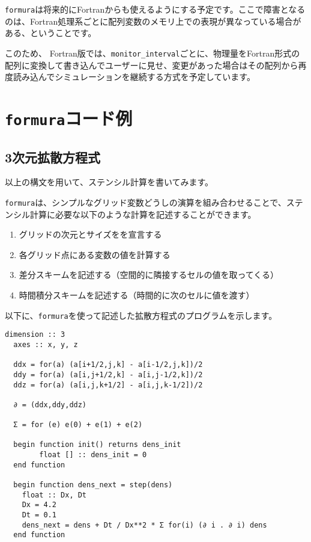\documentclass{jsarticle}
\newcommand{\formura}{{\texttt{formura}}}
\begin{document}
\formura は将来的にFortranからも使えるようにする予定です。ここで障害となるのは、Fortran処理系ごとに配列変数のメモリ上での表現が異なっている場合がある、ということです。

このため、
Fortran版では、\verb`monitor_interval`ごとに、物理量をFortran形式の配列に変換して書き込んでユーザーに見せ、変更があった場合はその配列から再度読み込んでシミュレーションを継続する方式を予定しています。

\newpage
\section{\formura コード例}
\subsection{3次元拡散方程式}

以上の構文を用いて、ステンシル計算を書いてみます。


\formura は、シンプルなグリッド変数どうしの演算を組み合わせることで、ステンシル計算に必要な以下のような計算を記述することができます。

\begin{enumerate}
\item グリッドの次元とサイズをを宣言する
\item 各グリッド点にある変数の値を計算する
\item 差分スキームを記述する（空間的に隣接するセルの値を取ってくる）
\item 時間積分スキームを記述する（時間的に次のセルに値を渡す）
\end{enumerate}


以下に、\formura を使って記述した拡散方程式のプログラムを示します。

\begin{lstlisting}[mathescape]
  dimension :: 3
  axes :: x, y, z

  ddx = for(a) (a[i+1/2,j,k] - a[i-1/2,j,k])/2
  ddy = for(a) (a[i,j+1/2,k] - a[i,j-1/2,k])/2
  ddz = for(a) (a[i,j,k+1/2] - a[i,j,k-1/2])/2

  ∂ = (ddx,ddy,ddz)

  Σ = for (e) e(0) + e(1) + e(2)

  begin function init() returns dens_init
        float [] :: dens_init = 0
  end function

  begin function dens_next = step(dens)
    float :: Dx, Dt
    Dx = 4.2
    Dt = 0.1
    dens_next = dens + Dt / Dx**2 * Σ for(i) (∂ i . ∂ i) dens
  end function
\end{lstlisting}
\end{document}
